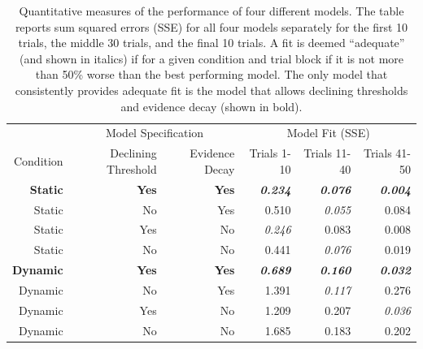 \documentclass[authoryear]{elsarticle}
\begin{document}
\begin{table}[p]
\begin{center}
\caption{Quantitative measures of the performance of four different models. The table reports sum squared errors (SSE) for all four models separately for the first 10 trials, the middle 30 trials, and the final 10 trials. A fit is deemed ``adequate'' (and shown in italics) if for a given condition and trial block if it is not more than 50\% worse than the best performing model. The only model that consistently provides adequate fit is the model that allows declining thresholds and evidence decay (shown in bold).}
\label{tab:sse}
\vspace*{6pt}
\footnotesize
\begin{tabular}{r|rr|rrr}
& \multicolumn{2}{|c|}{Model Specification} & \multicolumn{3}{|c}{Model Fit (SSE)} \\
Condition & Declining Threshold & Evidence Decay & Trials 1-10 & Trials 11-40 & Trials 41-50 \\ \hline
\textbf{Static} &  \textbf{Yes} & \textbf{Yes} & \textbf{\textit{0.234}} & \textbf{\textit{0.076}}  & \textbf{\textit{0.004}} \\
Static &  No  & Yes & 0.510          & \textit{0.055}  & 0.084 \\
Static &  Yes & No  & \textit{0.246} & 0.083  & 0.008 \\
Static &  No  & No  & 0.441          & \textit{0.076}  & 0.019 \\ \hline
\textbf{Dynamic} & \textbf{Yes} & \textbf{Yes} & \textbf{\textit{0.689}} & \textbf{\textit{0.160}}  & \textbf{\textit{0.032}} \\
Dynamic & No  & Yes & 1.391          & \textit{0.117}  & 0.276 \\
Dynamic & Yes & No  & 1.209          & 0.207           & \textit{0.036} \\
Dynamic & No  & No  & 1.685          & 0.183           & 0.202
\end{tabular}
\end{center}
\end{table}
\end{document}
